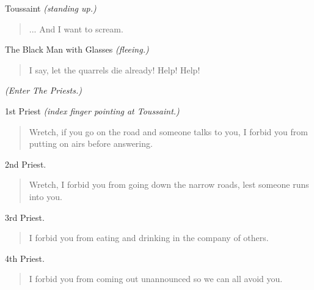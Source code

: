 \documentclass[letterpaper,article,12pt,oneside,notitlepage]{memoir}
\begin{document}
\begin{center}Toussaint \textit{(standing up.)}\end{center}

\begin{verse}
... And I want to scream. \\
\end{verse}

\begin{center} The Black Man with Glasses \textit{(fleeing.)}\end{center}

\begin{verse}
I say, let the quarrels die already! Help! Help!  \\
\end{verse}

\textit{(Enter The Priests.)}

\begin{center}1st Priest \textit{(index finger pointing at Toussaint.)}\end{center}

\begin{verse}
Wretch, if you go on the road and someone talks to you, I forbid you from putting on airs before answering. \\
\end{verse}

\begin{center}2nd Priest.\end{center}

\begin{verse}
Wretch, I forbid you from going down the narrow roads, lest someone runs into you. \\
\end{verse}

\begin{center}3rd Priest.\end{center}

\begin{verse}
I forbid you from eating and drinking in the company of others. \\
\end{verse}

\begin{center}4th Priest.\end{center}

\begin{verse}
I forbid you from coming out unannounced so we can all avoid you. \\
\end{verse}
\end{document}
